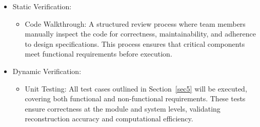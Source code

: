 \documentclass[12pt, titlepage]{article}
\begin{document}
\begin{itemize}
\item Static Verification:
  \begin{itemize}
      \item Code Walkthrough: A structured review process where team members
        manually inspect the code for correctness, maintainability, and
        adherence to design specifications. This process ensures that critical
        components meet functional requirements before execution.
  \end{itemize}
  \item Dynamic Verification:
    \begin{itemize}
      \item Unit Testing: All test cases outlined in Section~\ref{sec5} will
        be executed, covering both functional and non-functional requirements.
        These tests ensure correctness at the module and system levels,
        validating reconstruction accuracy and computational efficiency.
      \end{itemize}
  \end{itemize}
\end{document}
